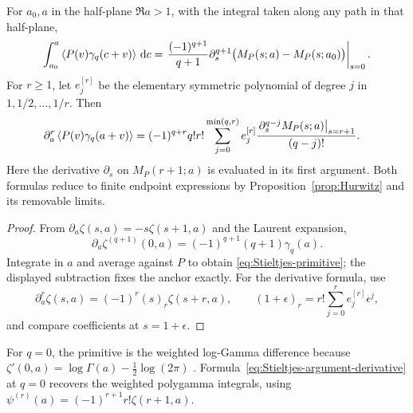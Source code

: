 \begin{corollary}
\label{cor:Stieltjes-calculus}
For $a_0,a$ in the half-plane $\Re a>1$, with the integral taken along
any path in that half-plane,
\begin{equation}\label{eq:Stieltjes-primitive}
 \int_{a_0}^a\left\langle P(v)\gamma_q(c+v)\right\rangle\,\mathrm d c
 =\left.\frac{(-1)^{q+1}}{q+1}\partial_s^{q+1}
       \bigl(M_P(s;a)-M_P(s;a_0)\bigr)\right|_{s=0}.
\end{equation}
For $r\ge1$, let $e_j^{[r]}$ be the elementary symmetric polynomial of
degree $j$ in $1,1/2,\ldots,1/r$. Then
\begin{equation}\label{eq:Stieltjes-argument-derivative}
\begin{split}
 \partial_a^r\left\langle P(v)\gamma_q(a+v)\right\rangle
 ={}&(-1)^{q+r}q!r!
 \sum_{j=0}^{\min(q,r)}e_j^{[r]}
 \frac{\left.\partial_s^{q-j}M_P(s;a)\right|_{s=r+1}}{(q-j)!}.
\end{split}
\end{equation}
Here the derivative $\partial_s$ on $M_P(r+1;a)$ is evaluated in its
first argument. Both formulas reduce to finite endpoint expressions by
Proposition~\ref{prop:Hurwitz} and its removable limits.
\end{corollary}
\begin{proof}
From $\partial_a\zeta(s,a)=-s\zeta(s+1,a)$ and the Laurent expansion,
\[
 \partial_a\zeta^{(q+1)}(0,a)
 =(-1)^{q+1}(q+1)\gamma_q(a).
\]
Integrate in $a$ and average against $P$ to obtain
\eqref{eq:Stieltjes-primitive}; the displayed subtraction fixes the
anchor exactly. For the derivative formula, use
\[
 \partial_a^r\zeta(s,a)=(-1)^r(s)_r\zeta(s+r,a),\qquad
 (1+\epsilon)_r=r!\sum_{j=0}^re_j^{[r]}\epsilon^j,
\]
and compare coefficients at $s=1+\epsilon$.
\end{proof}

For $q=0$, the primitive is the weighted log-Gamma difference because
$\zeta'(0,a)=\log\Gamma(a)-\tfrac12\log(2\pi)$
\cite{DLMF25}. Formula~\eqref{eq:Stieltjes-argument-derivative} at
$q=0$ recovers the weighted polygamma integrals, using
$\psi^{(r)}(a)=(-1)^{r+1}r!\zeta(r+1,a)$.

